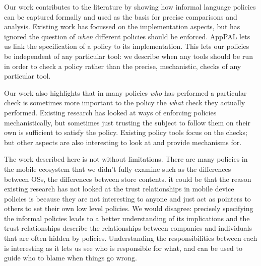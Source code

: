 \documentclass[thesis.tex]{subfiles}
\begin{document}
Our work contributes to the literature by showing how informal language policies
can be captured formally and used as the basis for precise comparisons and
analysis. Existing work has focussed on the implementation aspects, but has
ignored the question of \emph{when} different policies should be enforced.
AppPAL lets us link the specification of a policy to its implementation. This
lets our policies be independent of any particular tool: we describe when any
tools should be run in order to check a policy rather than the precise,
mechanistic, checks of any particular tool.


Our work also highlights that in many policies \emph{who} has performed a
particular check is sometimes more important to the policy the \emph{what} check
they actually performed. Existing research has looked at ways of enforcing
policies mechanistically, but sometimes just trusting the subject to follow them
on their own is sufficient to satisfy the policy. Existing policy tools focus on
the checks; but other aspects are also interesting to look at and provide
mechanisms for.


The work described here is not without limitations. There are many policies in
the mobile ecosystem that we didn't fully examine such as the differences
between OSs, the differences between store contents. it could be that the reason
existing research has not looked at the trust relationships in mobile device
policies is because they are not interesting to anyone and just act as pointers
to others to set their own low level policies. We would disagree: precisely
specifying the informal policies leads to a better understanding of its
implications and the trust relationships describe the relationships between
companies and individuals that are often hidden by policies. Understanding the
responsibilities between each is interesting as it lets us see who is
responsible for what, and can be used to guide who to blame when things go
wrong.
\end{document}
